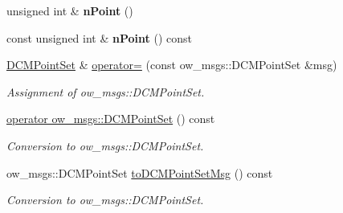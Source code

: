 \begin{DoxyCompactItemize}
\item 
unsigned int \& {\bfseries n\+Point} ()\hypertarget{classow__core_1_1DCMPointSet_a4559bba6530e0075b1c893e61f192de4}{}\label{classow__core_1_1DCMPointSet_a4559bba6530e0075b1c893e61f192de4}

\item 
const unsigned int \& {\bfseries n\+Point} () const \hypertarget{classow__core_1_1DCMPointSet_aa9a4f7124f98ebf34427529c7280f5f1}{}\label{classow__core_1_1DCMPointSet_aa9a4f7124f98ebf34427529c7280f5f1}

\item 
\hyperlink{classow__core_1_1DCMPointSet}{D\+C\+M\+Point\+Set} \& \hyperlink{classow__core_1_1DCMPointSet_a7aea70c61390a14517d551174e5c816d}{operator=} (const ow\+\_\+msgs\+::\+D\+C\+M\+Point\+Set \&msg)\hypertarget{classow__core_1_1DCMPointSet_a7aea70c61390a14517d551174e5c816d}{}\label{classow__core_1_1DCMPointSet_a7aea70c61390a14517d551174e5c816d}

\begin{DoxyCompactList}\small\item\em Assignment of ow\+\_\+msgs\+::\+D\+C\+M\+Point\+Set. \end{DoxyCompactList}\item 
\hyperlink{classow__core_1_1DCMPointSet_ae1e2d6f6cf2b84417a45efcd1ab18df3}{operator ow\+\_\+msgs\+::\+D\+C\+M\+Point\+Set} () const \hypertarget{classow__core_1_1DCMPointSet_ae1e2d6f6cf2b84417a45efcd1ab18df3}{}\label{classow__core_1_1DCMPointSet_ae1e2d6f6cf2b84417a45efcd1ab18df3}

\begin{DoxyCompactList}\small\item\em Conversion to ow\+\_\+msgs\+::\+D\+C\+M\+Point\+Set. \end{DoxyCompactList}\item 
ow\+\_\+msgs\+::\+D\+C\+M\+Point\+Set \hyperlink{classow__core_1_1DCMPointSet_a3d82f537a6aabec8ea5c43f11645b75f}{to\+D\+C\+M\+Point\+Set\+Msg} () const \hypertarget{classow__core_1_1DCMPointSet_a3d82f537a6aabec8ea5c43f11645b75f}{}\label{classow__core_1_1DCMPointSet_a3d82f537a6aabec8ea5c43f11645b75f}

\begin{DoxyCompactList}\small\item\em Conversion to ow\+\_\+msgs\+::\+D\+C\+M\+Point\+Set. \end{DoxyCompactList}\end{DoxyCompactItemize}
